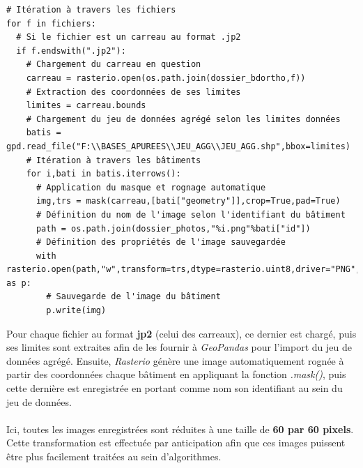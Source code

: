 \documentclass[
  11pt,
  french,
]{article}
\begin{document}
\begin{tcolorbox}[title= Extraction des photographies ,colback=boitecode]
\begin{lstlisting}[style=code]
# Itération à travers les fichiers
for f in fichiers:
  # Si le fichier est un carreau au format .jp2
  if f.endswith(".jp2"):
    # Chargement du carreau en question
    carreau = rasterio.open(os.path.join(dossier_bdortho,f))
    # Extraction des coordonnées de ses limites
    limites = carreau.bounds
    # Chargement du jeu de données agrégé selon les limites données
    batis = gpd.read_file("F:\\BASES_APUREES\\JEU_AGG\\JEU_AGG.shp",bbox=limites)
    # Itération à travers les bâtiments
    for i,bati in batis.iterrows():
      # Application du masque et rognage automatique
      img,trs = mask(carreau,[bati["geometry"]],crop=True,pad=True)
      # Définition du nom de l'image selon l'identifiant du bâtiment
      path = os.path.join(dossier_photos,"%i.png"%bati["id"])
      # Définition des propriétés de l'image sauvegardée
      with rasterio.open(path,"w",transform=trs,dtype=rasterio.uint8,driver="PNG",height=60,width=60,count=3) as p:
        # Sauvegarde de l'image du bâtiment
        p.write(img)\end{lstlisting}
\end{tcolorbox}

Pour chaque fichier au format \textbf{jp2} (celui des carreaux), ce
dernier est chargé, puis ses limites sont extraites afin de les fournir
à \emph{GeoPandas} pour l'import du jeu de données agrégé. Ensuite,
\emph{Rasterio} génère une image automatiquement rognée à partir des
coordonnées chaque bâtiment en appliquant la fonction \emph{.mask()},
puis cette dernière est enregistrée en portant comme nom son identifiant
au sein du jeu de données.\\
~\\
Ici, toutes les images enregistrées sont réduites à une taille de
\textbf{60 par 60 pixels}. Cette transformation est effectuée par
anticipation afin que ces images puissent être plus facilement traitées
au sein d'algorithmes.\\
\end{document}
